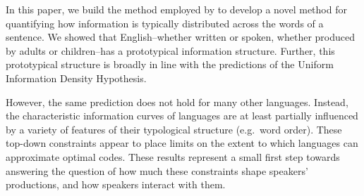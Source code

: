 \documentclass[entropy,article,submit,moreauthors,pdftex]{mdpi}
\begin{document}
In this paper, we build the method employed by \citet{yu2016} to develop
a novel method for quantifying how information is typically distributed
across the words of a sentence. We showed that English--whether written
or spoken, whether produced by adults or children--has a prototypical
information structure. Further, this prototypical structure is broadly
in line with the predictions of the Uniform Information Density
Hypothesis.

However, the same prediction does not hold for many other languages.
Instead, the characteristic information curves of languages are at least
partially influenced by a variety of features of their typological
structure (e.g.~word order). These top-down constraints appear to place
limits on the extent to which languages can approximate optimal codes.
These results represent a small first step towards answering the
question of how much these constraints shape speakers' productions, and
how speakers interact with them.

%

\vspace{6pt}




\end{document}
